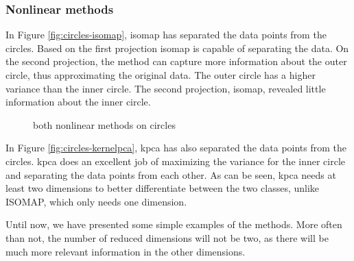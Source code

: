 \subsubsection{Nonlinear methods}\label{subsubsec:nonlinear-methods-on-circles}
In Figure \ref{fig:circles-isomap}, \gls{isomap} has separated the data points from the circles. Based on the first projection \gls{isomap} is capable of separating the data. On the second projection, the method can capture more information about the outer circle, thus approximating the original data. The outer circle has a higher variance than the inner circle. The second projection, \gls{isomap}, revealed little information about the inner circle.

\begin{figure}
    \centering
    \qquad
    \caption{both nonlinear methods on circles}
    \label{fig:nonlinear-methods-circles}
\end{figure}

In Figure \ref{fig:circles-kernelpca}, \gls{kpca} has also separated the data points from the circles. \gls{kpca} does an excellent job of maximizing the variance for the inner circle and separating the data points from each other. As can be seen, \gls{kpca} needs at least two dimensions to better differentiate between the two classes, unlike ISOMAP, which only needs one dimension.


Until now, we have presented some simple examples of the methods. More often than not, the number of reduced dimensions will not be two, as there will be much more relevant information in the other dimensions.